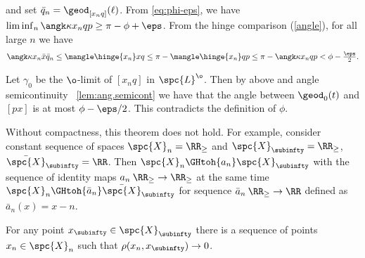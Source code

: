 and set $\bar q_n=\geod_{[x_n q]}(\ell)$.
From \ref{eq:phi-eps}, we have $\liminf_n\angk\kappa{x_n}q p\ge \pi-\phi+\eps$.
From the hinge comparison (\ref{angle}), for all large $n$ we have
$$\angk\kappa{x_n}{\bar x}{\bar q_n}
\le\mangle\hinge{x_n}x q
\le \pi - \mangle\hinge{x_n}q p
\le \pi-\angk\kappa{x_n}q p
< \phi-\tfrac\eps2.$$

Let $\gamma_0$ be the $\o$-limit of $[x_nq]$ in $\spc{L}^\o$. Then by above and angle semicontinuity ~\ref{lem:ang.semicont} we have that the angle between $\geod_0(t)$ and $[px]$ is at most $\phi-\eps/2$. This contradicts the definition of $\phi$.









Without compactness, this theorem does not hold. 
For example, consider constant sequence of spaces  $\spc{X}_n=\RR_\ge$ and $\spc{X}_\subinfty=\RR_\ge$, $\bar{\spc{X}}_\subinfty=\RR$.
Then $\spc{X}_n\GHtoh{a_n}\spc{X}_\subinfty$ with the sequence of identity maps
$a_n\:\RR_\ge\to\RR_\ge$ at the same time 
$\spc{X}_n\GHtoh{\bar a_n}\bar{\spc{X}}_\subinfty$
for sequence $\bar a_n\:\RR_\ge\to\RR$ defined as $\bar a_n(x)=x-n$.












\begin{subthm}{}
For any point $x_\subinfty\in\spc{X}_\subinfty$ there is a sequence of points  $x_n\in\spc{X}_n$ such that $\rho(x_n,x_\subinfty)\to0$. 
\end{subthm}


